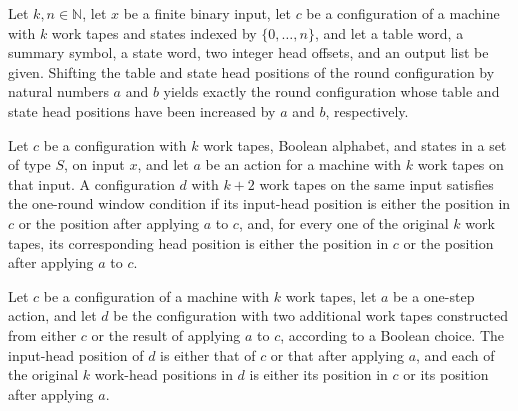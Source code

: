 \begin{lemma}
\label{Turing.StepBlock.roundData_shift}
\leanok
{}
Let $k,n\in\mathbb N$, let $x$ be a finite binary input, let $c$ be a configuration of a
machine with $k$ work tapes and states indexed by $\{0,\ldots,n\}$, and let a table
word, a summary symbol, a state word, two integer head offsets, and an output list be
given. Shifting the table and state head positions of the round configuration by natural
numbers $a$ and $b$ yields exactly the round configuration whose table and state head
positions have been increased by $a$ and $b$, respectively.
\end{lemma}

\begin{definition}
\label{Turing.StepBlock.RoundWindow}
\leanok
{}
Let $c$ be a configuration with $k$ work tapes, Boolean alphabet, and states in a set of
type $S$, on input $x$, and let $a$ be an action for a machine with $k$ work tapes on
that input. A configuration $d$ with $k+2$ work tapes on the same input satisfies the
one-round window condition if its input-head position is either the position in $c$ or
the position after applying $a$ to $c$, and, for every one of the original $k$ work
tapes, its corresponding head position is either the position in $c$ or the position
after applying $a$ to $c$.
\end{definition}

\begin{lemma}
\label{Turing.StepBlock.roundData_window}
\leanok
{}
Let $c$ be a configuration of a machine with $k$ work tapes, let $a$ be a one-step
action, and let $d$ be the configuration with two additional work tapes constructed from
either $c$ or the result of applying $a$ to $c$, according to a Boolean choice. The
input-head position of $d$ is either that of $c$ or that after applying $a$, and each of
the original $k$ work-head positions in $d$ is either its position in $c$ or its
position after applying $a$.
\end{lemma}

